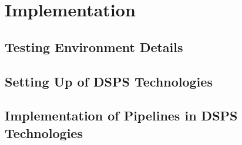 \section{Implementation}
\label{sec:implementation}

\subsection{Testing Environment Details} %
\label{sub:testing_environment_details}



\subsection{Setting Up of DSPS Technologies} %
\label{sub:setting_up_of_dsps_technologies}



\subsection{Implementation of Pipelines in DSPS Technologies} %
\label{sub:implementation_of_pipelines_in_dsps_technol}

